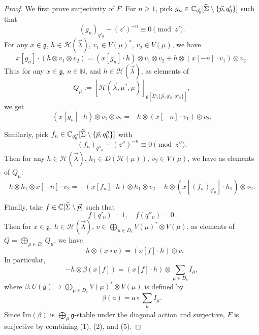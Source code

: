 \documentclass[12pt]{article}
\begin{document}
\begin{proof}
We first prove surjectivity of $F$. For $n\ge1$, pick $g_n\in\mathbb{C}_{q'_0}[\widetilde\Sigma\setminus\{\vec p,q'_0\}]$ such that
\[
(g_n)_{q'_0} - (z')^{-n} \equiv 0\pmod{z'}.
\]
For any $x\in\mathfrak g$, $h\in\mathcal H(\vec\lambda)$, $v_1\in V(\mu)^*$, $v_2\in V(\mu)$, we have
\[
x[g_n]\cdot(h\otimes v_1\otimes v_2)
= (x[g_n]\cdot h)\otimes v_1\otimes v_2 + h\otimes (x[-n]\cdot v_1)\otimes v_2.
\]
Thus for any $x\in\mathfrak g$, $n\in\mathbb N$, and $h\in\mathcal H(\vec\lambda)$, as elements of
\[
Q_\mu := [\mathcal H(\vec\lambda,\mu^*,\mu)]_{\mathfrak g[\widetilde\Sigma\setminus\{\vec p,q'_0,q''_0\}]},
\]
we get
\begin{equation}
(x[g_n]\cdot h)\otimes v_1\otimes v_2
= -h\otimes(x[-n]\cdot v_1)\otimes v_2.
\tag{1}
\end{equation}

Similarly, pick $f_n\in\mathbb{C}_{q''_0}[\widetilde\Sigma\setminus\{\vec p,q''_0\}]$ with
\[
(f_n)_{q''_0} - (z'')^{-n} \equiv 0\pmod{z''}.
\]
Then for any $h\in\mathcal H(\vec\lambda)$, $h_1\in D(\mathcal H(\mu))$, $v_2\in V(\mu)$, we have as elements of $Q_\mu$:
\begin{equation}
h\otimes h_1\otimes x[-n]\cdot v_2
= - (x[f_n]\cdot h)\otimes h_1\otimes v_2 - h\otimes (x[(f_n)_{q'_0}]\cdot h_1)\otimes v_2.
\tag{2}
\end{equation}

Finally, take $f\in\mathbb{C}[\widetilde\Sigma\setminus\vec p]$ such that
\begin{equation}
f(q'_0)=1,\quad f(q''_0)=0.
\tag{3}
\end{equation}
Then for $x\in\mathfrak g$, $h\in\mathcal H(\vec\lambda)$, $v\in\bigoplus_{\mu\in D_c}V(\mu)^*\otimes V(\mu)$, as elements of $Q=\bigoplus_{\mu\in D_c}Q_\mu$, we have
\begin{equation}
-h\otimes (x\circ v) = (x[f]\cdot h)\otimes v.
\tag{4}
\end{equation}
In particular,
\begin{equation}
-h\otimes \beta(x[f]) = (x[f]\cdot h)\otimes \sum_{\mu\in D_c} I_\mu,
\tag{5}
\end{equation}
where $\beta:U(\mathfrak g)\to\bigoplus_{\mu\in D_c}V(\mu)^*\otimes V(\mu)$ is defined by
\begin{equation}
\beta(a) = a\circ\sum_{\mu}I_\mu.
\tag{6}
\end{equation}
Since $\mathrm{Im}(\beta)$ is $\bigoplus_\mu\mathfrak g$-stable under the diagonal action and surjective, $F$ is surjective by combining (1), (2), and (5).


\end{proof}
\end{document}
